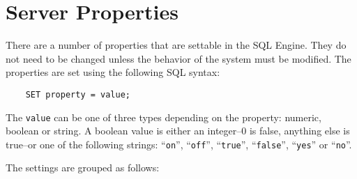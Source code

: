 
%

\section{Server Properties}
\label{ServerProperties}

  There are a number of properties that are settable in the SQL
Engine.  They do not need to be changed unless the behavior of the
system must be modified.  The properties are set using the following
SQL syntax:

\begin{verbatim}
    SET property = value;
\end{verbatim}

The \verb`value` can be one of three types depending on the property:
numeric, boolean or string.  A boolean value is either an integer--0
is false, anything else is true--or one of the following strings:
``\verb`on`'', ``\verb`off`'', ``\verb`true`'', ``\verb`false`'',
``\verb`yes`'' or ``\verb`no`''.

The settings are grouped as follows:



